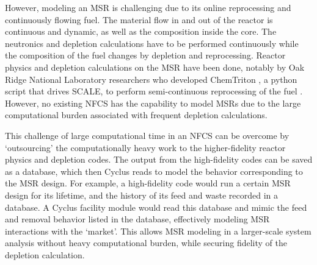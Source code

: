However, modeling an \gls{MSR} is challenging due to its online reprocessing
and continuously flowing fuel.
The material flow in and out of the reactor is continuous and dynamic, as well as the
composition inside the core.
The neutronics and depletion calculations have to be performed continuously while
the composition of the fuel changes by depletion and reprocessing.
Reactor physics and depletion calculations
on the \gls{MSR} have been done, notably by 
 Oak Ridge National Laboratory researchers who developed
ChemTriton \cite{powers_new_2013}, a python script that drives SCALE,
to perform semi-continuous reprocessing of the fuel \cite{powers_inventory_2014, betzler_fuel_2018}.
However, no existing \gls{NFCS} has the capability to model \glspl{MSR}
due to the large computational burden associated with frequent depletion calculations.

This challenge of large computational time in an \gls{NFCS} can be overcome by `outsourcing' the computationally
heavy work to the higher-fidelity reactor physics and depletion codes. The output from the
high-fidelity codes can be saved as a database, which then Cyclus reads to model the behavior
corresponding to the \gls{MSR} design. For example, a high-fidelity code would run a certain
\gls{MSR} design for its lifetime, and the history of its feed and waste recorded in a
database. A Cyclus facility module would read this database and mimic the feed and removal
behavior listed in the database, effectively modeling \gls{MSR} interactions with the `market'.
This allows \gls{MSR} modeling in a larger-scale system analysis without heavy computational
burden, while securing fidelity of the depletion calculation.